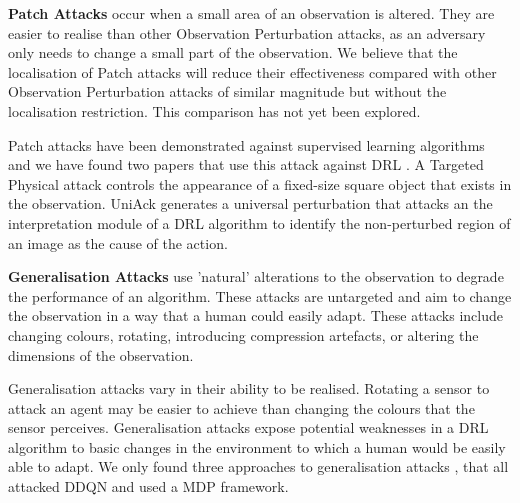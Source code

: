 \documentclass[conference,compsoc]{IEEEtran}
\begin{document}
\noindent \textbf{Patch Attacks}
 occur when a small area of an observation is altered. They are easier to realise than other Observation Perturbation attacks, as an adversary only needs to change a small part of the observation. We believe that the localisation of  Patch attacks will reduce their effectiveness compared with other Observation Perturbation attacks of similar magnitude but without the localisation restriction. This comparison has not yet been explored.

Patch attacks have been demonstrated against supervised learning algorithms \cite{brown_adversarial_2017} and we have found two papers that use this attack against DRL \cite{buddareddygari_targeted_2021,huai_malicious_2020}. A Targeted Physical attack \cite{buddareddygari_targeted_2021} controls the appearance of a fixed-size square object that exists in the observation. UniAck \cite{huai_malicious_2020} generates a universal perturbation that attacks an the interpretation module of a DRL algorithm to identify the non-perturbed region of an image as the cause of the action.


\noindent \textbf{Generalisation Attacks}
 use 'natural' alterations to the observation to degrade the performance of an algorithm. These attacks are untargeted and aim to change the observation in a way that a human could easily adapt. These attacks include changing  colours, rotating, introducing compression artefacts, or altering the dimensions of the observation. 

Generalisation attacks vary in their ability to be realised. Rotating a sensor to attack an agent may be easier to achieve than changing the colours that the sensor perceives. Generalisation attacks expose potential weaknesses in a DRL algorithm to basic changes in the environment to which a human would be easily able to adapt. We only found three approaches to generalisation attacks  \cite{korkmaz_daylight_2020,korkmaz_adversarial_2021,korkmaz_assessing_2021}, that all attacked DDQN and used a MDP framework.
\end{document}
